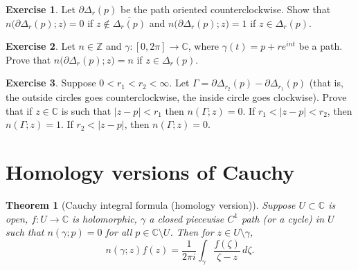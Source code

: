 \documentclass[12pt,openany]{book}
\newcommand{\sabs}[1]{\lvert {#1} \rvert}
\newcommand{\C}{{\mathbb{C}}}
\newcommand{\Z}{{\mathbb{Z}}}
\theoremstyle{plain}
\newtheorem{thm}{Theorem}[section]
\theoremstyle{remark}
\theoremstyle{definition}
\newenvironment{exbox}{%
    \def\FrameCommand{\vrule width 1pt \relax\hspace {10pt}}%
    \MakeFramed {\advance \hsize -\width \FrameRestore }%
}{%
    \endMakeFramed
}
\theoremstyle{exercise}
\newtheorem{exercise}{Exercise}[section]
\theoremstyle{example}
\begin{document}
\begin{exbox}
\begin{exercise} \label{exercise:windingcircle}
Let $\partial \Delta_r(p)$ be the path oriented counterclockwise.
Show that $n\bigl(\partial \Delta_r(p);z\bigr) = 0$ if $z \notin
\overline{\Delta_r(p)}$ and 
$n\bigl(\partial \Delta_r(p);z\bigr) = 1$ if $z \in \Delta_r(p)$.
\end{exercise}

\begin{exercise}
Let $n \in \Z$ and $\gamma \colon [0,2\pi] \to \C$, where
$\gamma(t) = p + re^{in t}$ be a path.
Prove that
$n\bigl(\partial \Delta_r(p);z\bigr) = n$ if $z \in \Delta_r(p)$.
\end{exercise}

\begin{exercise} \label{exercise:windingcircles}
Suppose $0 < r_1 < r_2 < \infty$.
Let $\Gamma = \partial \Delta_{r_2}(p) - \partial \Delta_{r_1} (p)$
(that is, the outside circles goes counterclockwise, the inside circle goes
clockwise).
Prove that if $z \in \C$ is such that $\sabs{z-p} < r_1$ then
$n(\Gamma;z) = 0$.  If $r_1 < \sabs{z-p} < r_2$, then
$n(\Gamma;z) = 1$.  If $r_2 < \sabs{z-p}$, then
$n(\Gamma;z) = 0$.
\end{exercise}
\end{exbox}



\section{Homology versions of Cauchy}


\begin{thm}[Cauchy integral formula (homology version)]
\label{thm:CIFhomology}
Suppose $U \subset \C$ is open, $f \colon U \to \C$ is holomorphic,
$\gamma$ a closed piecewise $C^1$ path (or a cycle) in $U$
such that $n(\gamma;p) = 0$ for all $p \in \C \setminus U$.
Then for $z \in U \setminus \gamma$,
\begin{equation*}
n(\gamma;z)
f(z)
=
\frac{1}{2\pi i}
\int_{\gamma}
\frac{f(\zeta)}{\zeta-z}
\,
d \zeta .
\end{equation*}
\end{thm}
\end{document}
